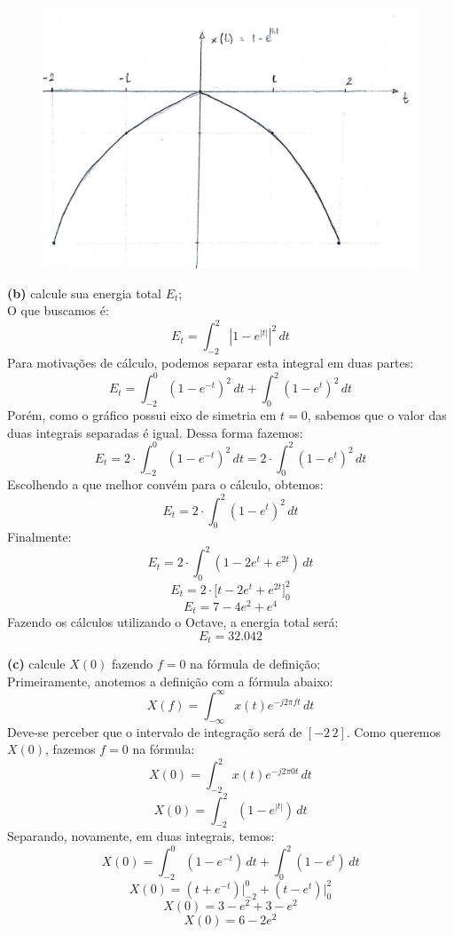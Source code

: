 \documentclass[10pt, a4paper]{article}
\begin{document}
\begin{figure}[h]
    \includegraphics[scale=0.3]{plot2a.jpeg}
    \centering
\end{figure}

{\textbf{(b)}} calcule sua energia total $E_{t}$;\\
O que buscamos é:
\[E_{t} = \int_{-2}^{2} |1 - e^{|t|}|^2\,dt\]
Para motivações de cálculo, podemos separar esta integral em duas partes:
\[E_{t} = \int_{-2}^{0} (1 - e^{-t})^{2}\,dt + \int_{0}^{2} (1 - e^{t})^{2}\,dt\]
Porém, como o gráfico possui eixo de simetria em $t = 0$, sabemos que o valor das duas integrais separadas é igual. Dessa forma fazemos:
\[E_{t} = 2 \cdot \int_{-2}^{0} (1 - e^{-t})^{2}\,dt = 2 \cdot \int_{0}^{2} (1 - e^{t})^{2}\,dt\]
Escolhendo a que melhor convém para o cálculo, obtemos:
\[E_{t} = 2 \cdot \int_{0}^{2} (1 - e^{t})^{2}\,dt\]
Finalmente:
\[E_{t} = 2 \cdot \int_{0}^{2} (1 - 2e^t + e^{2t})\,dt\]
\[E_{t} = 2 \cdot \bigl[t - 2e^t + e^{2t} \bigr]_{0}^{2}\]
\[E_{t} = 7 - 4e^2 + e^{4}\]
Fazendo os cálculos utilizando o Octave, a energia total será:
\[E_{t} = 32.042\]

{\textbf{(c)}} calcule $X(0)$ fazendo $f = 0$ na fórmula de definição;\\
Primeiramente, anotemos a definição com a fórmula abaixo:
\[X(f) = \int_{-\infty}^{\infty} x(t) e^{-j2\pi ft}\,dt\]
Deve-se perceber que o intervalo de integração será de $[-2\,2]$.
Como queremos $X(0)$, fazemos $f = 0$ na fórmula:
\[X(0) = \int_{-2}^{2} x(t) e^{-j2\pi 0t}\,dt\]
\[X(0) = \int_{-2}^{2} (1 - e^{|t|})\,dt\]
Separando, novamente, em duas integrais, temos:
\[X(0) = \int_{-2}^{0} (1 - e^{-t})\,dt + \int_{0}^{2} (1 - e^{t})\,dt\]
\[X(0) = (t + e^{-t})\bigg|_{-2}^{0} + (t - e^{t})\bigg|_{0}^{2}\]
\[X(0) = 3 - e^2 + 3 - e^2\]
\[X(0) = 6 - 2e^2\]
\end{document}
